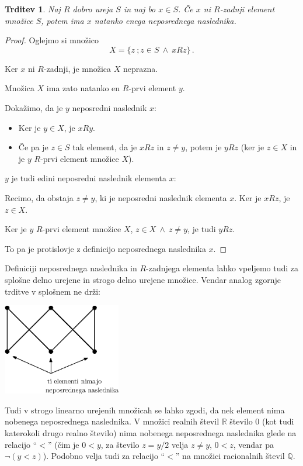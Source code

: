 \documentclass[11pt,paper=b5,footinclude,headinclude]{scrbook} %
\def\inn {{~\wedge~}}
\newtheorem*{trditev}{Trditev}
\begin{document}
\begin{trditev}
Naj $R$ dobro ureja $S$ in naj bo $x\in S$. Če $x$ ni $R$-zadnji element množice $S$, potem ima $x$ natanko enega neposrednega naslednika.
\end{trditev}

\begin{proof}
Oglejmo si množico
$$X = \{z~;z\in S\inn xRz\}\,.$$

Ker $x$ ni $R$-zadnji, je množica $X$ neprazna.

Množica $X$ ima zato natanko en $R$-prvi element $y$.

Dokažimo, da je $y$ neposredni naslednik $x$:
\begin{itemize}
  \item Ker je $y\in X$, je $xRy$.
  \item Če pa je $z\in S$ tak element, da je $xRz$ in $z\neq y$, potem je
$yRz$ (ker je $z\in X$ in je $y$ $R$-prvi element množice $X$).
\end{itemize}

$y$ je tudi edini neposredni naslednik elementa $x$:

Recimo, da obstaja $z\neq y$, ki je neposredni naslednik elementa $x$.
Ker je $xRz$, je $z\in X$.

Ker je $y$ $R$-prvi element množice $X$, $z\in X\inn z\neq y$,
je tudi $yRz$.

To pa je protislovje z definicijo neposrednega naslednika $x$.
\end{proof}

Definiciji neposrednega naslednika in $R$-zadnjega elementa lahko vpeljemo tudi za splošne delno urejene in strogo delno urejene množice. Vendar analog zgornje trditve v splošnem ne drži:

\begin{center}
\includegraphics[height=40mm]{Hasse3.eps}
\end{center}

Tudi v strogo linearno urejenih množicah se lahko zgodi, da nek element nima nobenega neposrednega naslednika.
V množici realnih števil $\mathbb{R}$ število $0$ (kot tudi katerokoli drugo realno število) nima nobenega neposrednega naslednika glede na relacijo ``$<$'' (čim je $0<y$, za število $z = y/2$ velja $z\neq y$, $0<z$, vendar pa $\neg(y<z)$).
Podobno velja tudi za relacijo ``$<$'' na množici racionalnih števil $\mathbb{Q}$.
\end{document}
